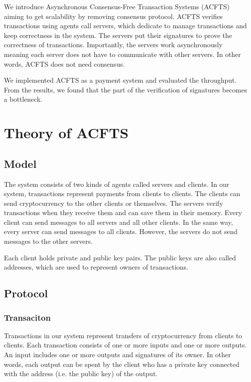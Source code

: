 \documentclass[a4paper, oneside]{discothesis}
\begin{document}
We introduce Asynchronous Consensus-Free Transaction Systems (ACFTS) aiming to get scalability
by removing consensus protocol.
ACFTS verifies transactions using agents call servers, which dedicate to manage transactions
and keep correctness in the system.
The servers put their signatures to prove the correctness of transactions.
Importantly, the servers work asynchronously meaning each server does not have to
communicate with other servers.
In other words, ACFTS does not need consensus.

We implemented ACFTS as a payment system and evaluated the throughput.
From the results, we found that the part of the verification of signatures becomes a bottleneck.

\chapter{Theory of ACFTS}

\section{Model}
The system consists of two kinds of agents called servers and clients.
In our system, transactions represent payments from clients to clients.
The clients can send cryptocurrency to the other clients or themselves.
The servers verify transactions when they receive them and can save them in their memory.
Every client can send messages to all servers and all other clients.
In the same way, every server can send messages to all clients.
However, the servers do not send messages to the other servers.

Each client holds private and public key pairs.
The public keys are also called addresses, which are used to represent owners of transactions.

\section{Protocol} %

\subsection{Transaciton}
Transactions in our system represent transfers of cryptocurrency from clients to clients.
Each transaction consists of one or more inputs and one or more outputs.
An input includes one or more outputs and signatures of its owner.
In other words, each output can be spent by the client who has a private key connected with
the address (i.e. the public key) of the output.
\end{document}
